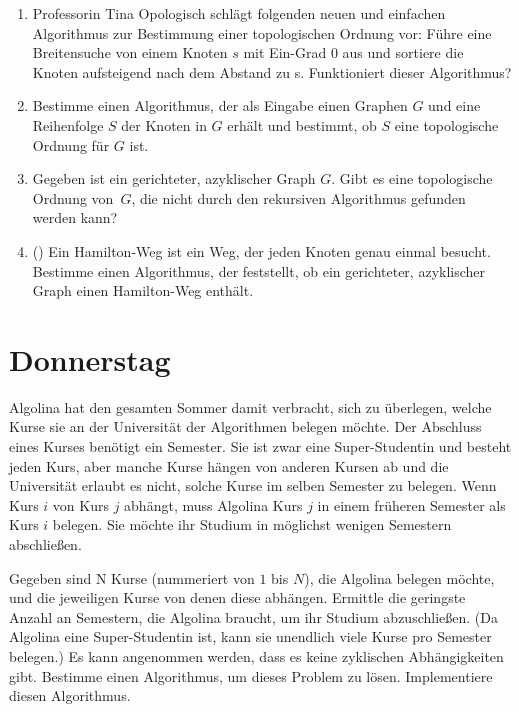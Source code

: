 \documentclass{uebung_cs}
\begin{document}
\begin{aufgabe}\mbox{}
	\begin{enumerate}
		\item Professorin Tina Opologisch schlägt folgenden neuen und einfachen Algorithmus zur Bestimmung einer topologischen Ordnung vor: Führe eine Breitensuche von einem Knoten $s$ mit Ein-Grad $0$ aus und sortiere die Knoten aufsteigend nach dem Abstand zu s. Funktioniert dieser Algorithmus?
		\item Bestimme einen Algorithmus, der als Eingabe einen Graphen $G$ und eine Reihenfolge $S$ der Knoten in $G$ erhält und bestimmt, ob $S$ eine topologische Ordnung für $G$ ist.
		\item Gegeben ist ein gerichteter, azyklischer Graph $G$.
		Gibt es eine topologische Ordnung von~$G$, die nicht durch den rekursiven Algorithmus gefunden werden kann?
		\item (\hard) Ein Hamilton-Weg ist ein Weg, der jeden Knoten genau einmal besucht.
		Bestimme einen Algorithmus, der feststellt, ob ein gerichteter, azyklischer Graph einen Hamilton-Weg enthält.
	\end{enumerate}
\end{aufgabe}

\section*{Donnerstag}
\begin{aufgabe}[Studiengangplanung]
Algolina hat den gesamten Sommer damit verbracht, sich zu überlegen, welche Kurse sie an der Universität der Algorithmen belegen möchte.
Der Abschluss eines Kurses benötigt ein Semester. Sie ist zwar eine Super-Studentin und besteht jeden Kurs, aber manche Kurse hängen von anderen Kursen ab und die Universität erlaubt es nicht, solche Kurse im selben Semester zu belegen. Wenn Kurs $i$ von Kurs $j$ abhängt, muss Algolina Kurs $j$ in einem früheren Semester als Kurs $i$ belegen.
Sie möchte ihr Studium in möglichst wenigen Semestern abschließen.

Gegeben sind N Kurse (nummeriert von $1$ bis $N$), die Algolina belegen möchte, und die jeweiligen Kurse von denen diese abhängen.
Ermittle die geringste Anzahl an Semestern, die Algolina braucht, um ihr Studium abzuschließen.
(Da Algolina eine Super-Studentin ist, kann sie unendlich viele Kurse pro Semester belegen.)
Es kann angenommen werden, dass es keine zyklischen Abhängigkeiten gibt.
Bestimme einen Algorithmus, um dieses Problem zu lösen. Implementiere diesen Algorithmus.
\end{aufgabe}
\end{document}
